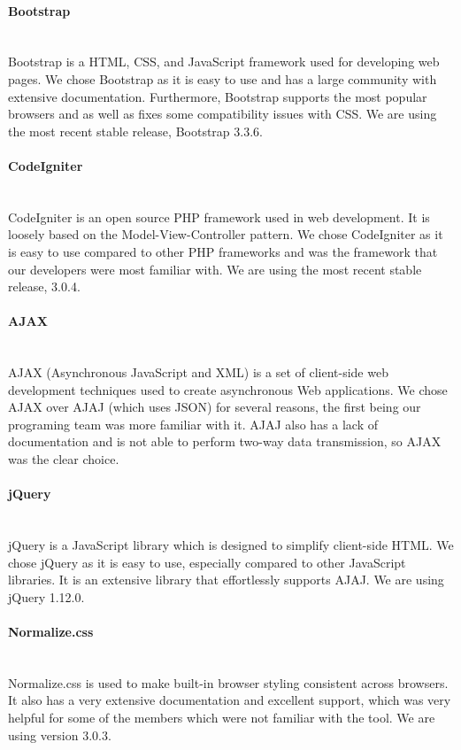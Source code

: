 \documentclass[12pt]{article}
\begin{document}
\paragraph*{Bootstrap}~\\
Bootstrap is a HTML, CSS, and JavaScript framework used for developing web pages. We chose Bootstrap as it is easy to use and has a large community with extensive documentation. Furthermore, Bootstrap supports the most popular browsers and as well as fixes some compatibility issues with CSS. We are using the most recent stable release, Bootstrap 3.3.6.
%
\paragraph*{CodeIgniter}~\\
CodeIgniter is an open source PHP framework used in web development. It is loosely based on the Model-View-Controller pattern. We chose CodeIgniter as it is easy to use compared to other PHP frameworks and was the framework that our developers were most familiar with. We are using the most recent stable release, 3.0.4.
%
\paragraph*{AJAX}~\\
AJAX (Asynchronous JavaScript and XML) is a set of client-side web development techniques used to create asynchronous Web applications. We chose AJAX over AJAJ (which uses JSON) for several reasons, the first being our programing team was more familiar with it. AJAJ also has a lack of documentation and is not able to perform two-way data transmission, so AJAX was the clear choice.
%
\paragraph*{jQuery}~\\
jQuery is a JavaScript library which is designed to simplify client-side HTML. We chose jQuery as it is easy to use, especially compared to other JavaScript libraries. It is an extensive library that effortlessly supports AJAJ. We are using jQuery 1.12.0.
%
\paragraph*{Normalize.css}~\\
Normalize.css is used to make built-in browser styling consistent across browsers. It also has a very extensive documentation and excellent support, which was very helpful for some of the members which were not familiar with the tool. We are using version 3.0.3.
%
\end{document}
